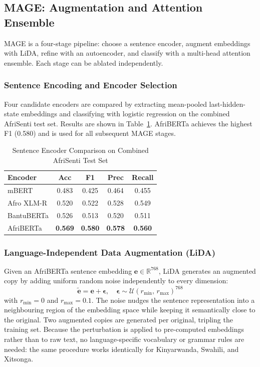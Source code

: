 \documentclass[conference]{IEEEtran}
\begin{document}
\subsection{MAGE: Augmentation and Attention Ensemble}\label{sec:mage}

MAGE is a four-stage pipeline: choose a sentence encoder, augment
embeddings with LiDA, refine with an autoencoder, and classify with a
multi-head attention ensemble. Each stage can be ablated independently.

\subsubsection{Sentence Encoding and Encoder Selection}
Four candidate encoders are compared by extracting mean-pooled
last-hidden-state embeddings and classifying with logistic regression
on the combined AfriSenti test set. Results are shown in
Table~\ref{tab:embed}. AfriBERTa achieves the highest F1 (0.580)
and is used for all subsequent MAGE stages.

\begin{table}[htbp]
\caption{Sentence Encoder Comparison on Combined AfriSenti Test Set}
\label{tab:embed}
\begin{center}
\begin{tabular}{lcccc}
\toprule
\textbf{Encoder} & \textbf{Acc} & \textbf{F1} & \textbf{Prec} & \textbf{Recall} \\
\midrule
mBERT          & 0.483 & 0.425 & 0.464 & 0.455 \\
Afro XLM-R     & 0.520 & 0.522 & 0.528 & 0.549 \\
BantuBERTa     & 0.526 & 0.513 & 0.520 & 0.511 \\
AfriBERTa      & \textbf{0.569} & \textbf{0.580} & \textbf{0.578} & \textbf{0.560} \\
\bottomrule
\end{tabular}
\end{center}
\end{table}

\subsubsection{Language-Independent Data Augmentation (LiDA)}
Given an AfriBERTa sentence embedding $\mathbf{e} \in \mathbb{R}^{768}$,
LiDA generates an augmented copy by adding uniform random noise
independently to every dimension:
\begin{equation}
    \tilde{\mathbf{e}} = \mathbf{e} + \boldsymbol{\epsilon},
    \quad
    \boldsymbol{\epsilon} \sim \mathcal{U}(r_{\min},\, r_{\max})^{768}
    \label{eq:lida}
\end{equation}
with $r_{\min} = 0$ and $r_{\max} = 0.1$. The noise nudges the sentence
representation into a neighbouring region of the embedding space while
keeping it semantically close to the original. Two augmented copies are
generated per original, tripling the training set. Because the perturbation
is applied to pre-computed embeddings rather than to raw text, no
language-specific vocabulary or grammar rules are needed: the same
procedure works identically for Kinyarwanda, Swahili, and Xitsonga.
\end{document}

